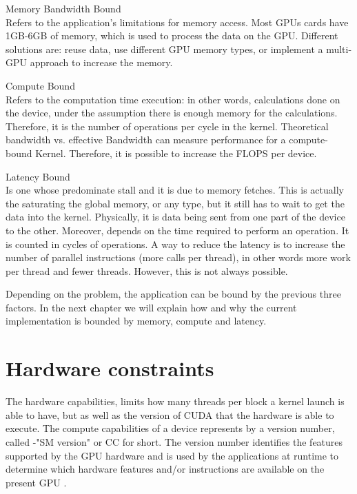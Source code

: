 \begin{description}

 \item{Memory Bandwidth Bound} \hfill \\
  Refers to the application's limitations for memory access. Most GPUs cards have 1GB-6GB of memory, which is used to process the data on the GPU. Different solutions are: reuse data, use different GPU memory types, or implement a multi-GPU approach to increase the memory.

  \item{Compute Bound} \hfill \\
Refers to the computation time execution: in other words, calculations done on the device, under the assumption there is enough memory for the calculations. Therefore, it is the number of operations per cycle in the kernel. Theoretical bandwidth vs. effective Bandwidth can measure performance for a compute-bound Kernel. Therefore, it is possible to increase the FLOPS per device.

 \item{Latency Bound} \hfill \\
 Is one whose predominate stall and it is due to memory fetches. This is actually the saturating the global memory, or any type, but it still has to wait to get the data into the kernel. Physically, it is data being sent from one part of the device to the other. Moreover, depends on the time required to perform an operation. It is counted in cycles of operations. A way to reduce the latency is to increase the number of parallel instructions (more  calls per thread), in other words more work per thread and fewer threads. However, this is not always possible.
 \end{description}
 
Depending on the problem, the application can be bound by the previous three factors. In the next chapter we will explain how and why the current implementation is bounded by memory, compute and latency.

\section{Hardware constraints}


The hardware capabilities, limits how many threads per block a kernel launch is able to have, but as well as the version of CUDA that the hardware is able to execute. The compute capabilities of a device represents by a version number, called -"SM version" or CC for short. The version number identifies the features supported by the GPU hardware and is used by the applications at runtime to determine which hardware features and/or instructions are available on the present GPU \cite{tool}. 

